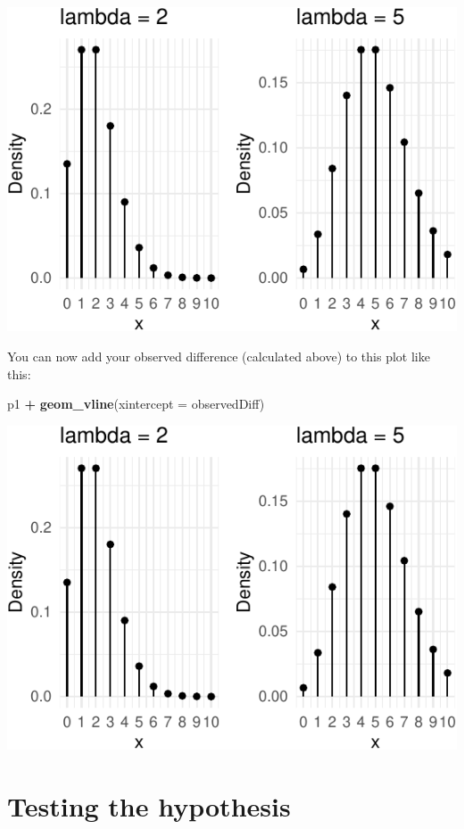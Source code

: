 \documentclass[
  a4paperpaper,
]{book}
\newenvironment{Shaded}{\begin{snugshade}}{\end{snugshade}}
\newcommand{\DataTypeTok}[1]{\textcolor[rgb]{0.13,0.29,0.53}{#1}}
\newcommand{\KeywordTok}[1]{\textcolor[rgb]{0.13,0.29,0.53}{\textbf{#1}}}
\newcommand{\NormalTok}[1]{#1}
\newcommand{\OperatorTok}[1]{\textcolor[rgb]{0.81,0.36,0.00}{\textbf{#1}}}
\newcommand{\StringTok}[1]{\textcolor[rgb]{0.31,0.60,0.02}{#1}}
\begin{document}
\includegraphics{BB852_files/figure-latex/unnamed-chunk-142-1.pdf}

You can now add your observed difference (calculated above) to this plot like this:

\begin{Shaded}
\begin{Highlighting}[]
\NormalTok{p1 }\OperatorTok{+}\StringTok{ }\KeywordTok{geom\_vline}\NormalTok{(}\DataTypeTok{xintercept =}\NormalTok{ observedDiff)}
\end{Highlighting}
\end{Shaded}

\includegraphics{BB852_files/figure-latex/unnamed-chunk-143-1.pdf}

\hypertarget{testing-the-hypothesis}{%
\section{Testing the hypothesis}\label{testing-the-hypothesis}}
\end{document}
